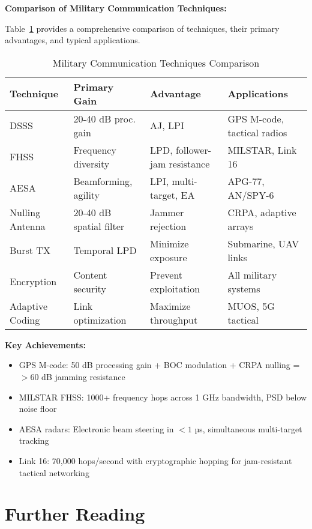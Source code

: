 \textbf{Comparison of Military Communication Techniques:}

Table~\ref{tab:military-techniques} provides a comprehensive comparison of techniques, their primary advantages, and typical applications.

\begin{table}[h]
\centering
\caption{Military Communication Techniques Comparison}
\label{tab:military-techniques}
\small
\begin{tabular}{@{}p{2.5cm}p{3cm}p{3.2cm}p{3.5cm}@{}}
\toprule
\textbf{Technique} & \textbf{Primary Gain} & \textbf{Advantage} & \textbf{Applications} \\
\midrule
DSSS & 20-40 dB proc. gain & AJ, LPI & GPS M-code, tactical radios \\
FHSS & Frequency diversity & LPD, follower-jam resistance & MILSTAR, Link 16 \\
AESA & Beamforming, agility & LPI, multi-target, EA & APG-77, AN/SPY-6 \\
Nulling Antenna & 20-40 dB spatial filter & Jammer rejection & CRPA, adaptive arrays \\
Burst TX & Temporal LPD & Minimize exposure & Submarine, UAV links \\
Encryption & Content security & Prevent exploitation & All military systems \\
Adaptive Coding & Link optimization & Maximize throughput & MUOS, 5G tactical \\
\bottomrule
\end{tabular}
\end{table}

\textbf{Key Achievements:}
\begin{itemize}
\item GPS M-code: 50 dB processing gain + BOC modulation + CRPA nulling = $>60$ dB jamming resistance
\item MILSTAR FHSS: 1000+ frequency hops across 1 GHz bandwidth, PSD below noise floor
\item AESA radars: Electronic beam steering in $<1$ µs, simultaneous multi-target tracking
\item Link 16: 70,000 hops/second with cryptographic hopping for jam-resistant tactical networking
\end{itemize}

\section{Further Reading}

